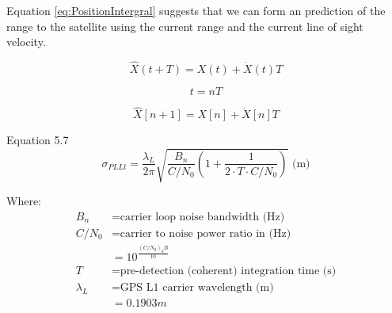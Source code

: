Equation \ref{eq:PositionIntergral} suggests that we can form an prediction of the range to the satellite using the current range and the current line of sight velocity. 

\begin{equation}
\hat{X}(t+T) = X(t) +  \dot{X}(t) T
\end{equation}

\begin{equation}
t = nT
\end{equation}

\begin{equation}
\hat{X}[n+1] = X[n] +  \dot{X}[n] T
\end{equation}






Equation 5.7
\begin{equation}
\sigma_{PLLt} = \frac{\lambda_L}{2 \pi} \sqrt{\frac{B_n}{C/N_0}(1+\frac{1}{2 \cdot T \cdot C/N_0})} \text{ (m)}
\end{equation}

Where:
\begin{align*}
B_n &= \text{carrier loop noise bandwidth (Hz)} \\
C/N_0 &= \text{carrier to noise power ratio in (Hz)} \\
&=10^\frac{(C/N_0)_dB}{10} \\
T &= \text{pre-detection (coherent) integration time (s)} \\
\lambda_L &= \text{GPS L1 carrier wavelength (m)}\\
&= 0.1903 m
\end{align*}





